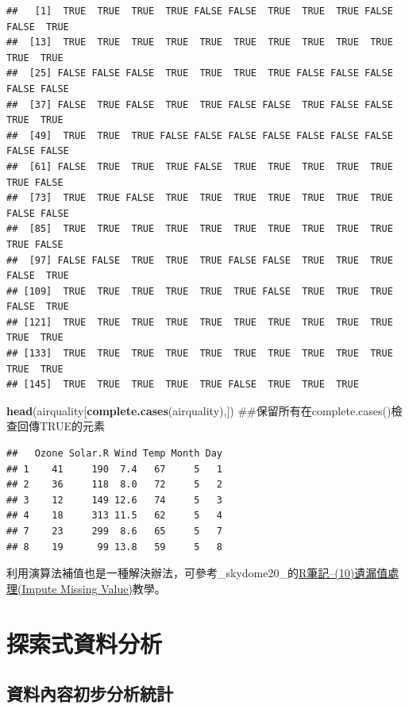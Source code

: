 \documentclass[]{book}
\newenvironment{Shaded}{\begin{snugshade}}{\end{snugshade}}
\newcommand{\KeywordTok}[1]{\textcolor[rgb]{0.13,0.29,0.53}{\textbf{{#1}}}}
\newcommand{\NormalTok}[1]{{#1}}
\theoremstyle{definition}
\theoremstyle{definition}
\theoremstyle{remark}
\begin{document}
\begin{verbatim}
##   [1]  TRUE  TRUE  TRUE  TRUE FALSE FALSE  TRUE  TRUE  TRUE FALSE FALSE  TRUE
##  [13]  TRUE  TRUE  TRUE  TRUE  TRUE  TRUE  TRUE  TRUE  TRUE  TRUE  TRUE  TRUE
##  [25] FALSE FALSE FALSE  TRUE  TRUE  TRUE  TRUE FALSE FALSE FALSE FALSE FALSE
##  [37] FALSE  TRUE FALSE  TRUE  TRUE FALSE FALSE  TRUE FALSE FALSE  TRUE  TRUE
##  [49]  TRUE  TRUE  TRUE FALSE FALSE FALSE FALSE FALSE FALSE FALSE FALSE FALSE
##  [61] FALSE  TRUE  TRUE  TRUE FALSE  TRUE  TRUE  TRUE  TRUE  TRUE  TRUE FALSE
##  [73]  TRUE  TRUE FALSE  TRUE  TRUE  TRUE  TRUE  TRUE  TRUE  TRUE FALSE FALSE
##  [85]  TRUE  TRUE  TRUE  TRUE  TRUE  TRUE  TRUE  TRUE  TRUE  TRUE  TRUE FALSE
##  [97] FALSE FALSE  TRUE  TRUE  TRUE FALSE FALSE  TRUE  TRUE  TRUE FALSE  TRUE
## [109]  TRUE  TRUE  TRUE  TRUE  TRUE  TRUE FALSE  TRUE  TRUE  TRUE FALSE  TRUE
## [121]  TRUE  TRUE  TRUE  TRUE  TRUE  TRUE  TRUE  TRUE  TRUE  TRUE  TRUE  TRUE
## [133]  TRUE  TRUE  TRUE  TRUE  TRUE  TRUE  TRUE  TRUE  TRUE  TRUE  TRUE  TRUE
## [145]  TRUE  TRUE  TRUE  TRUE  TRUE FALSE  TRUE  TRUE  TRUE
\end{verbatim}

\begin{Shaded}
\begin{Highlighting}[]
\KeywordTok{head}\NormalTok{(airquality[}\KeywordTok{complete.cases}\NormalTok{(airquality),]) ##保留所有在complete.cases()檢查回傳TRUE的元素}
\end{Highlighting}
\end{Shaded}

\begin{verbatim}
##   Ozone Solar.R Wind Temp Month Day
## 1    41     190  7.4   67     5   1
## 2    36     118  8.0   72     5   2
## 3    12     149 12.6   74     5   3
## 4    18     313 11.5   62     5   4
## 7    23     299  8.6   65     5   7
## 8    19      99 13.8   59     5   8
\end{verbatim}

利用演算法補值也是一種解決辦法，可參考\_skydome20\_的\href{http://www.rpubs.com/skydome20/R-Note10-Missing_Value}{R筆記--(10)遺漏值處理(Impute
Missing Value)}教學。

\chapter{探索式資料分析}\label{eda}

\section{資料內容初步分析統計}
\end{document}
